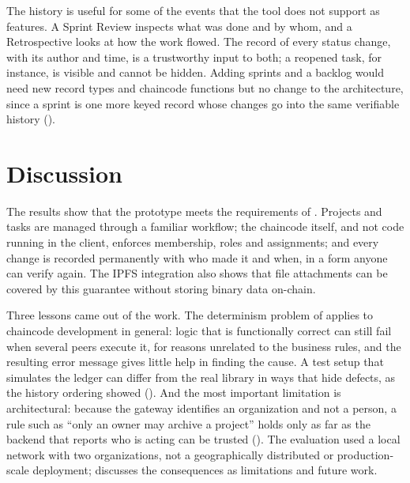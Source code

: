 The history is useful for some of the events that the tool does not support as features. A Sprint Review inspects what was done and by whom, and a Retrospective looks at how the work flowed. The record of every status change, with its author and time, is a trustworthy input to both; a reopened task, for instance, is visible and cannot be hidden. Adding sprints and a backlog would need new record types and chaincode functions but no change to the architecture, since a sprint is one more keyed record whose changes go into the same verifiable history ().

\section{Discussion}
\label{sec:results-discussion}

The results show that the prototype meets the requirements of . Projects and tasks are managed through a familiar workflow; the chaincode itself, and not code running in the client, enforces membership, roles and assignments; and every change is recorded permanently with who made it and when, in a form anyone can verify again. The IPFS integration also shows that file attachments can be covered by this guarantee without storing binary data on-chain.

Three lessons came out of the work. The determinism problem of  applies to chaincode development in general: logic that is functionally correct can still fail when several peers execute it, for reasons unrelated to the business rules, and the resulting error message gives little help in finding the cause. A test setup that simulates the ledger can differ from the real library in ways that hide defects, as the history ordering showed (). And the most important limitation is architectural: because the gateway identifies an organization and not a person, a rule such as ``only an owner may archive a project'' holds only as far as the backend that reports who is acting can be trusted (). The evaluation used a local network with two organizations, not a geographically distributed or production-scale deployment;  discusses the consequences as limitations and future work.
